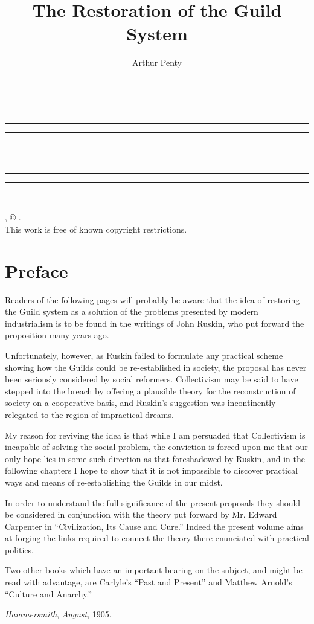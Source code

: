\documentclass{book}
\date{}
\title{The Restoration of the Guild System}
\author{Arthur Penty}
\makeatletter
\renewcommand{\maketitle}{
  \thispagestyle{empty}
  \vspace*{\stretch{1}}
  
  \begin{center}
    {\Huge \@title   \\[5mm]}
  \end{center}
  \vspace*{\stretch{2}}
  
  \newpage
  \thispagestyle{empty}
  \cleardoublepage

  \begin{center}  
    \thispagestyle{empty}
    \vspace*{\baselineskip}
    \rule{\textwidth}{1.6pt}\vspace*{-\baselineskip}\vspace*{2pt}
    \rule{\textwidth}{0.4pt}\\[\baselineskip]
    
    {\Huge\scshape \@title   \\[5mm]}
    {\Large }
    
    \rule{\textwidth}{0.4pt}\vspace*{-\baselineskip}\vspace{3.2pt}
    \rule{\textwidth}{1.6pt}\\[\baselineskip]

    \vspace*{4\baselineskip}

    {\Large \@author}
    \vfill
    
  \end{center}
  
  \pagebreak
  \newpage
  \thispagestyle{empty}
  \null\vfill
  \noindent
  \begin{center}
    {\emph{\@title}, © \@author.\\[5mm]}
    {This work is free of known copyright restrictions.\\[5mm]}
  \end{center}
  \pagebreak
  \newpage
}
\makeatother
\begin{document}



\maketitle

\setcounter{tocdepth}{0}
\setcounter{secnumdepth}{0}
\chapter*{Preface}
\label{chapter-0}
Readers of the following pages will probably be aware that the idea of restoring the Guild system as a solution of the problems presented by modern industrialism is to be found in the writings of John Ruskin, who put forward the proposition many years ago.

Unfortunately, however, as Ruskin failed to formulate any practical scheme showing how the Guilds could be re-established in society, the proposal has never been seriously considered by social reformers. Collectivism may be said to have stepped into the breach by offering a plausible theory for the reconstruction of society on a cooperative basis, and Ruskin’s suggestion was incontinently relegated to the region of impractical dreams.

My reason for reviving the idea is that while I am persuaded that Collectivism is incapable of solving the social problem, the conviction is forced upon me that our only hope lies in some such direction as that foreshadowed by Ruskin, and in the following chapters I hope to show that it is not impossible to discover practical ways and means of re-establishing the Guilds in our midst.

In order to understand the full significance of the present proposals they should be considered in conjunction with the theory put forward by Mr. Edward Carpenter in “Civilization, Its Cause and Cure.” Indeed the present volume aims at forging the links required to connect the theory there enunciated with practical politics.

Two other books which have an important bearing on the subject, and might be read with advantage, are Carlyle’s “Past and Present” and Matthew Arnold’s “Culture and Anarchy.”

\emph{Hammersmith}, \emph{August}, 1905.
\end{document}
